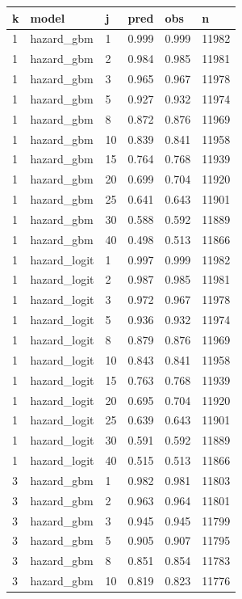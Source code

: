 \begin{tabular}{llllll}
\toprule
k & model & j & pred & obs & n \\
\midrule
1 & hazard\_gbm & 1 & 0.999 & 0.999 & 11982 \\
1 & hazard\_gbm & 2 & 0.984 & 0.985 & 11981 \\
1 & hazard\_gbm & 3 & 0.965 & 0.967 & 11978 \\
1 & hazard\_gbm & 5 & 0.927 & 0.932 & 11974 \\
1 & hazard\_gbm & 8 & 0.872 & 0.876 & 11969 \\
1 & hazard\_gbm & 10 & 0.839 & 0.841 & 11958 \\
1 & hazard\_gbm & 15 & 0.764 & 0.768 & 11939 \\
1 & hazard\_gbm & 20 & 0.699 & 0.704 & 11920 \\
1 & hazard\_gbm & 25 & 0.641 & 0.643 & 11901 \\
1 & hazard\_gbm & 30 & 0.588 & 0.592 & 11889 \\
1 & hazard\_gbm & 40 & 0.498 & 0.513 & 11866 \\
1 & hazard\_logit & 1 & 0.997 & 0.999 & 11982 \\
1 & hazard\_logit & 2 & 0.987 & 0.985 & 11981 \\
1 & hazard\_logit & 3 & 0.972 & 0.967 & 11978 \\
1 & hazard\_logit & 5 & 0.936 & 0.932 & 11974 \\
1 & hazard\_logit & 8 & 0.879 & 0.876 & 11969 \\
1 & hazard\_logit & 10 & 0.843 & 0.841 & 11958 \\
1 & hazard\_logit & 15 & 0.763 & 0.768 & 11939 \\
1 & hazard\_logit & 20 & 0.695 & 0.704 & 11920 \\
1 & hazard\_logit & 25 & 0.639 & 0.643 & 11901 \\
1 & hazard\_logit & 30 & 0.591 & 0.592 & 11889 \\
1 & hazard\_logit & 40 & 0.515 & 0.513 & 11866 \\
3 & hazard\_gbm & 1 & 0.982 & 0.981 & 11803 \\
3 & hazard\_gbm & 2 & 0.963 & 0.964 & 11801 \\
3 & hazard\_gbm & 3 & 0.945 & 0.945 & 11799 \\
3 & hazard\_gbm & 5 & 0.905 & 0.907 & 11795 \\
3 & hazard\_gbm & 8 & 0.851 & 0.854 & 11783 \\
3 & hazard\_gbm & 10 & 0.819 & 0.823 & 11776 \\

\end{tabular}
